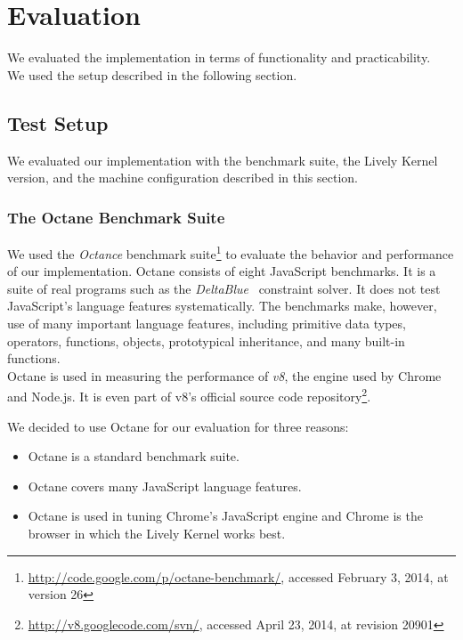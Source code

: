 \chapter{Evaluation} \label{chapter:EVALUATION}

We evaluated the implementation in terms of functionality and practicability.\\
We used the setup described in the following section.


\section{Test Setup} \label{sec:EVALUATION:1}

We evaluated our implementation with the benchmark suite, the Lively Kernel version, and the machine configuration described in this section.

\subsection{The Octane Benchmark Suite}

We used the \emph{Octance} benchmark suite\footnote{\url{http://code.google.com/p/octane-benchmark/}, accessed February 3, 2014, at version 26} to evaluate the behavior and performance of our implementation.
Octane consists of eight JavaScript benchmarks.
It is a suite of real programs such as the \emph{DeltaBlue}~\cite{FreemanBenson1990ICS} constraint solver.
It does not test JavaScript's language features systematically.
The benchmarks make, however, use of many important language features, including primitive data types, operators, functions, objects, prototypical inheritance, and many built-in functions.\\
Octane is used in measuring the performance of \emph{v8}, the engine used by Chrome and Node.js.
It is even part of v8's official source code repository\footnote{\url{http://v8.googlecode.com/svn/}, accessed April 23, 2014, at revision 20901}.

We decided to use Octane for our evaluation for three reasons:

\begin{itemize}
    \item Octane is a standard benchmark suite.
    \item Octane covers many JavaScript language features.
    \item Octane is used in tuning Chrome's JavaScript engine and Chrome is the browser in which the Lively Kernel works best.
\end{itemize}


